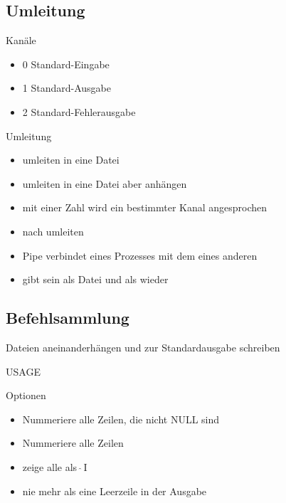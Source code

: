 \documentclass[aspectratio=43]{beamer}
\begin{document}
\subsection{Umleitung}
\begin{frame} 

	\begin{block}{Kanäle} 
	\begin{itemize}
	\item 0 Standard-Eingabe 
	\item 1 Standard-Ausgabe 
	\item 2 Standard-Fehlerausgabe 
	\end{itemize}
	\end{block}

	\begin{exampleblock}{Umleitung} 
	\begin{itemize}
	\item \co{>}  umleiten  in eine Datei
	\item \co{>>}  umleiten  in eine Datei aber anhängen
	\item {} mit einer Zahl wird ein bestimmter Kanal angesprochen
	\item {}   nach  umleiten
	\item \co{|} Pipe verbindet  eines Prozesses mit dem  eines anderen
	\item {} gibt sein  als Datei und als  wieder
	\end{itemize}
	\end{exampleblock}



\end{frame}

\subsection{Befehlsammlung}
\begin{frame} 
	\begin{block}{} 
        Dateien aneinanderhängen und zur Standardausgabe schreiben
	\end{block}
	\begin{block}{USAGE} 
	\end{block}
	\begin{exampleblock}{Optionen} 
	\begin{itemize}
	\item {} Nummeriere alle Zeilen, die nicht NULL sind
	\item {} Nummeriere alle Zeilen
	\item {} zeige alle \taste{$\leftrightharpoons\quad$}  als $\,\hat{}$\,I
	\item {} nie mehr als eine Leerzeile in der Ausgabe
	\end{itemize}
	\end{exampleblock}
\end{frame}
\end{document}
